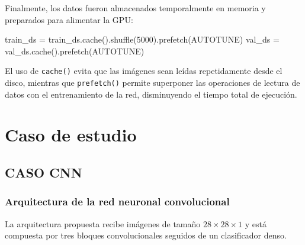 \documentclass[
  spanish,
  us-letterpaper,
  DIV=11,
  numbers=noendperiod]{scrreprt}
\newenvironment{Shaded}{\begin{snugshade}}{\end{snugshade}}
\newcommand{\DecValTok}[1]{\textcolor[rgb]{0.68,0.00,0.00}{#1}}
\newcommand{\NormalTok}[1]{\textcolor[rgb]{0.00,0.23,0.31}{#1}}
\newcommand{\OperatorTok}[1]{\textcolor[rgb]{0.37,0.37,0.37}{#1}}
\begin{document}
Finalmente, los datos fueron almacenados temporalmente en memoria y
preparados para alimentar la GPU:

\begin{Shaded}
\begin{Highlighting}[]
\NormalTok{train\_ds }\OperatorTok{=}\NormalTok{ train\_ds.cache().shuffle(}\DecValTok{5000}\NormalTok{).prefetch(AUTOTUNE)}
\NormalTok{val\_ds }\OperatorTok{=}\NormalTok{ val\_ds.cache().prefetch(AUTOTUNE)}
\end{Highlighting}
\end{Shaded}

El uso de \texttt{cache()} evita que las imágenes sean leídas
repetidamente desde el disco, mientras que \texttt{prefetch()} permite
superponer las operaciones de lectura de datos con el entrenamiento de
la red, disminuyendo el tiempo total de ejecución.


\chapter{Caso de estudio}\label{caso-de-estudio}

\section{CASO CNN}\label{caso-cnn}

\subsection{Arquitectura de la red neuronal
convolucional}\label{arquitectura-de-la-red-neuronal-convolucional}

La arquitectura propuesta recibe imágenes de tamaño
\(28\times28\times1\) y está compuesta por tres bloques convolucionales
seguidos de un clasificador denso.
\end{document}
